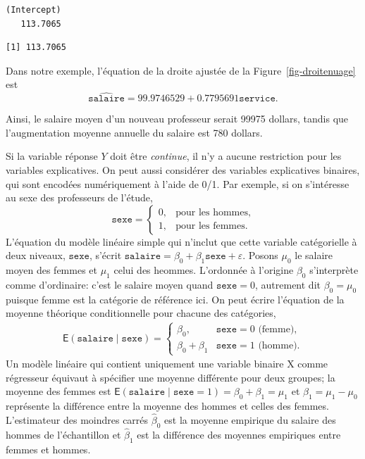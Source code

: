 \documentclass[
  11pt,
  letterpaper,
]{scrbook}
\newenvironment{Shaded}{\begin{snugshade}}{\end{snugshade}}
\newcommand{\FunctionTok}[1]{\textcolor[rgb]{0.28,0.35,0.67}{#1}}
\newcommand{\NormalTok}[1]{\textcolor[rgb]{0.00,0.23,0.31}{#1}}
\newcommand{\SpecialCharTok}[1]{\textcolor[rgb]{0.37,0.37,0.37}{#1}}
\theoremstyle{definition}
\theoremstyle{remark}
\begin{document}
\begin{verbatim}
(Intercept) 
   113.7065 
\end{verbatim}

\begin{Shaded}
\end{Shaded}

\begin{verbatim}
[1] 113.7065
\end{verbatim}

Dans notre exemple, l'équation de la droite ajustée de la
Figure~\ref{fig-droitenuage} est \[
\widehat{\texttt{salaire}} = 99.9746529 + 0.7795691\texttt{service}.
\]

Ainsi, le salaire moyen d'un nouveau professeur serait 99975 dollars,
tandis que l'augmentation moyenne annuelle du salaire est 780 dollars.

Si la variable réponse \(Y\) doit être \emph{continue}, il n'y a aucune
restriction pour les variables explicatives. On peut aussi considérer
des variables explicatives binaires, qui sont encodées numériquement à
l'aide de 0/1. Par exemple, si on s'intéresse au sexe des professeurs de
l'étude, \[
\texttt{sexe} = \begin{cases} 0 , & \text{pour les hommes},\\
1, & \text{pour les femmes.}
\end{cases}
\] L'équation du modèle linéaire simple qui n'inclut que cette variable
catégorielle à deux niveaux, \(\texttt{sexe}\), s'écrit
\(\texttt{salaire} = \beta_0 + \beta_1 \texttt{sexe} + \varepsilon\).
Posons \(\mu_0\) le salaire moyen des femmes et \(\mu_1\) celui des
heommes. L'ordonnée à l'origine \(\beta_0\) s'interprète comme
d'ordinaire: c'est le salaire moyen quand \(\texttt{sexe}=0\), autrement
dit \(\beta_0=\mu_0\) puisque femme est la catégorie de référence ici.
On peut écrire l'équation de la moyenne théorique conditionnelle pour
chacune des catégories, \begin{align*}
\mathsf{E}(\texttt{salaire} \mid \texttt{sexe})= \begin{cases}
\beta_0, & \texttt{sexe}=0 \text{ (femme)}, \\
\beta_0 + \beta_1 & \texttt{sexe}=1 \text{ (homme)}.
\end{cases}
\end{align*} Un modèle linéaire qui contient uniquement une variable
binaire \(\mathrm{X}\) comme régresseur équivaut à spécifier une moyenne
différente pour deux groupes; la moyenne des femmes est
\(\mathsf{E}(\texttt{salaire} \mid \texttt{sexe}=1) = \beta_0 + \beta_1 = \mu_1\)
et \(\beta_1=\mu_1-\mu_0\) représente la différence entre la moyenne des
hommes et celles des femmes. L'estimateur des moindres carrés
\(\widehat{\beta}_0\) est la moyenne empirique du salaire des hommes de
l'échantillon et \(\widehat{\beta}_1\) est la différence des moyennes
empiriques entre femmes et hommes.
\end{document}

